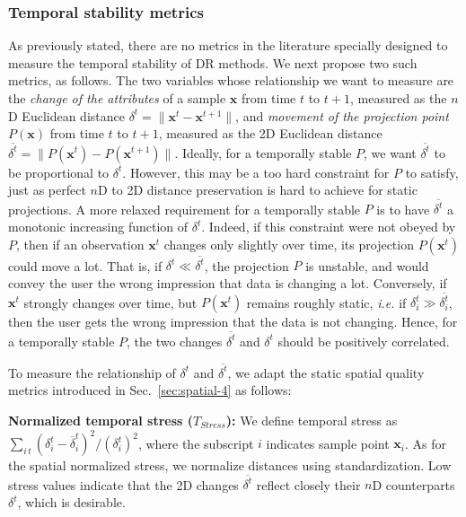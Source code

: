 \subsubsection{Temporal stability metrics}
%
As previously stated, there are no metrics in the literature specially designed to measure the temporal stability of DR methods. We next propose two such metrics, as follows. The two variables whose relationship we want to measure are the \emph{change of the attributes} of a sample $\mathbf{x}$ from time $t$ to $t+1$, measured as the $n$D Euclidean distance
$ \delta^t = \|\mathbf{x}^t - \mathbf{x}^{t+1}\|$, and \emph{movement of the projection point $P(\mathbf{x})$} from time $t$ to $t+1$, measured as the 2D Euclidean distance
$ \overline{\delta^t} = \|P(\mathbf{x}^t) - P(\mathbf{x}^{t+1})\|$. Ideally, for a temporally stable $P$, we want $\overline{\delta^t}$ to be proportional to $\delta^t$. However, this may be a too hard constraint for $P$ to satisfy, just as perfect $n$D to 2D distance preservation is hard to achieve for static projections. A more relaxed requirement for a temporally stable $P$ is to have
 $\overline{\delta^t}$ a monotonic increasing function of $\delta^t$. Indeed, if this constraint were not obeyed by $P$, then if an observation $\mathbf{x}^t$ changes only slightly over time, its projection  $P(\mathbf{x}^t)$ could move a lot. That is, if  $\delta^t \ll \overline{\delta^t}$, the projection $P$ is unstable, and would convey the user the wrong impression that data is changing a lot. Conversely, if $\mathbf{x}^t$ strongly changes over time, but $P(\mathbf{x}^t)$ remains roughly static, \emph{i.e.} if $\delta_i^t \gg \overline{\delta_i^t}$, then the user gets the wrong impression that the data is not changing. Hence, for a temporally stable $P$, the two changes $\overline{\delta^t}$ and ${\delta^t}$ should be positively correlated.

To measure the relationship of ${\delta^t}$ and $\overline{\delta^t}$, we adapt the static spatial quality metrics introduced in Sec.~\ref{sec:spatial-4} as follows:

\noindent
\textbf{Normalized temporal stress ($T_{Stress}$):} We define temporal stress as $\sum_{i\, t}{(\delta_{i}^{t}-\overline{\delta}_{i}^{t})^{2}} / { (\delta_{i}^t)^{2}}$, where the subscript $i$ indicates sample point $\mathbf{x}_i$. As for the spatial normalized stress, we normalize distances using standardization. Low stress values indicate that the 2D changes $\overline{\delta^t}$ reflect closely their $n$D counterparts ${\delta^t}$, which is desirable.

